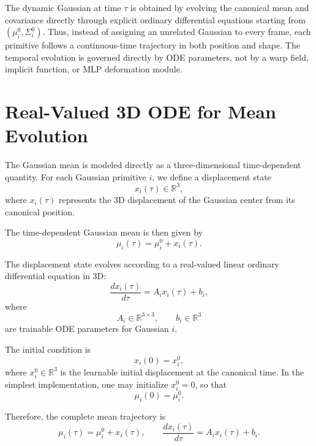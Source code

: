 \documentclass[11pt]{article}
\begin{document}
The dynamic Gaussian at time $\tau$ is obtained by evolving the canonical mean and covariance directly through explicit ordinary differential equations starting from $(\mu_i^0,\Sigma_i^0)$. Thus, instead of assigning an unrelated Gaussian to every frame, each primitive follows a continuous-time trajectory in both position and shape. The temporal evolution is governed directly by ODE parameters, not by a warp field, implicit function, or MLP deformation module.

\section{Real-Valued 3D ODE for Mean Evolution}

The Gaussian mean is modeled directly as a three-dimensional time-dependent quantity. For each Gaussian primitive $i$, we define a displacement state
\begin{equation}
x_i(\tau)\in\mathbb{R}^3,
\end{equation}
where $x_i(\tau)$ represents the 3D displacement of the Gaussian center from its canonical position.

The time-dependent Gaussian mean is then given by
\begin{equation}
\mu_i(\tau)=\mu_i^0+x_i(\tau).
\end{equation}

The displacement state evolves according to a real-valued linear ordinary differential equation in 3D:
\begin{equation}
\frac{d x_i(\tau)}{d\tau}
=
A_i x_i(\tau)+b_i,
\end{equation}
where
\begin{equation}
A_i\in\mathbb{R}^{3\times 3},
\qquad
b_i\in\mathbb{R}^3
\end{equation}
are trainable ODE parameters for Gaussian $i$.

The initial condition is
\begin{equation}
x_i(0)=x_i^0,
\end{equation}
where $x_i^0\in\mathbb{R}^3$ is the learnable initial displacement at the canonical time. In the simplest implementation, one may initialize $x_i^0=0$, so that
\begin{equation}
\mu_i(0)=\mu_i^0.
\end{equation}

Therefore, the complete mean trajectory is
\begin{equation}
\mu_i(\tau)=\mu_i^0+x_i(\tau),
\qquad
\frac{d x_i(\tau)}{d\tau}=A_i x_i(\tau)+b_i.
\end{equation}
\end{document}
